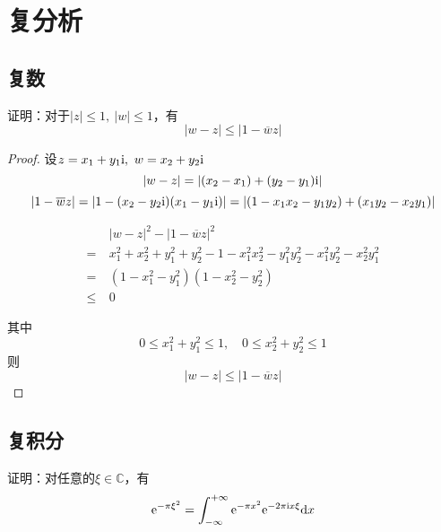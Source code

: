 \chapter{复分析}

\section{复数}

\begin{proposition}
    
    证明：对于$|z| \leq 1, \ |w| \leq 1$，有
    $$|w - z| \leq |1 - \overline{w}z|$$

\end{proposition}

\begin{proof}

    设$z = x_1 + y_1\mathrm{i},\ w = x_2 + y_2\mathrm{i}$
    $$|w - z| = | (x_2 - x_1) + (y_2 - y_1)\mathrm{i}| $$
    $$|1 - \overline{w}z| = |1 - (x_2 - y_2\mathrm{i}) (x_1 - y_1\mathrm{i})| = | (1 - x_1x_2 - y_1y_2) + (x_1y_2 - x_2y_1) |$$

    \begin{align*}
        &|w - z|^2 - |1 - \overline{w}z|^2 \\
        = \ & x_1^2 + x_2^2 + y_1^2 + y_2^2 - 1 - x_1^2x_2^2 -  y_1^2y_2^2 - x_1^2 y_2^2 -  x_2^2y_1^2 \\
        = \ & (1 - x_1^2 - y_1^2) (1 - x_2^2 - y_2^2) \\
        \leq \ & 0
    \end{align*}

    其中
    $$0 \leq x_1^2 + y_1^2 \leq 1, \quad 0 \leq x_2^2 + y_2^2 \leq 1$$
    则
    $$|w - z| \leq |1 - \overline{w}z|$$

\end{proof}

\section{复积分}

\begin{proposition}

    证明：对任意的$\xi \in \mathbb{C}$，有
    $$\mathrm{e}^{-\pi\xi^2} = \int_{-\infty}^{+\infty}{\mathrm{e}^{-\pi x^2}\mathrm{e}^{-2\pi \mathrm{i} x\xi}}\mathrm{d} x$$
    
\end{proposition}

